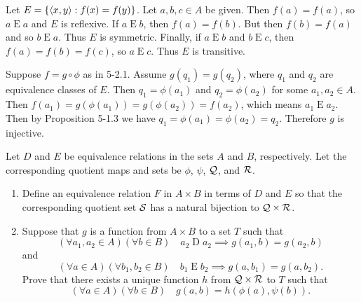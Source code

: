 \documentclass{report}
\newcommand*{\Erel}{\mathrel{E}}
\begin{document}
\begin{solution}
Let $E=\left\{ \left\langle x,y\right\rangle : f(x)=f(y) \right\}$. Let $a,b,c\in A$ be given. Then $f(a)=f(a)$, so $a\Erel a$ and $E$
is reflexive.
If $a\Erel b$, then $f(a)=f(b)$. But then $f(b)=f(a)$ and so $b\Erel a$. Thus $E$ is symmetric.
Finally, if $a\Erel b$ and $b\Erel c$, then $f(a)=f(b)=f(c)$, so $a\Erel c$. Thus $E$ is transitive.

Suppose $f=g\circ \phi$ as in 5-2.1. Assume $g(q_1)=g(q_2)$, where $q_1$ and $q_2$ are equivalence
classes of $E$. Then $q_1=\phi(a_1)$ and $q_2=\phi(a_2)$ for some $a_1,a_2\in A$.
Then $f(a_1)=g(\phi(a_1))=g(\phi(a_2))=f(a_2)$, which means $a_1\Erel a_2$.
Then by Proposition 5-1.3 we have $q_1=\phi(a_1)=\phi(a_2)=q_2$. Therefore $g$ is injective.
\end{solution}

\begin{exercise}
Let $D$ and $E$ be equivalence relations in the sets $A$ and $B$, respectively.
Let the corresponding quotient maps and sets be $\phi$, $\psi$, $\mathcal{Q}$, and $\mathcal{R}$.
\begin{enumerate}[label=(\alph*)]
    \item Define an equivalence relation $F$ in $A\times B$ in terms of $D$ and $E$ so
        that the corresponding quotient set $\mathcal{S}$ has a natural bijection to $\mathcal{Q}\times\mathcal{R}$.
    \item Suppose that $g$ is a function from $A\times B$ to a set $T$ such that
        \[(\forall a_1,a_2\in A)(\forall b\in B)\quad a_2\mathrel{D} a_2\implies g(a_1,b)=g(a_2,b)\]
        and
        \[(\forall a\in A)(\forall b_1,b_2\in B)\quad b_1\mathrel E b_2\implies g(a,b_1)=g(a,b_2).\]
        Prove that there exists a unique function $h$ from $\mathcal{Q}\times \mathcal{R}$ to $T$ such that
        \[(\forall a\in A)(\forall b\in B)\quad g(a,b)=h(\phi(a),\psi(b)).\]
\end{enumerate}
\end{exercise}
\end{document}
